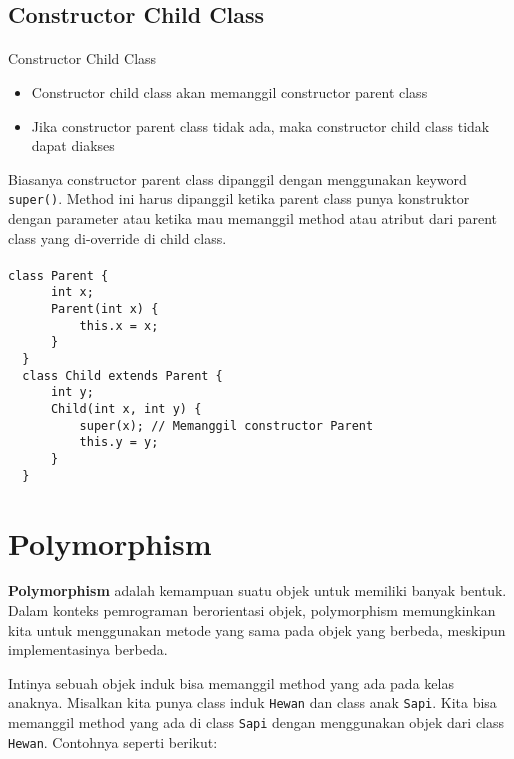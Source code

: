 \documentclass{../praktikum-ppt}
\begin{document}
    \subsection{Constructor Child Class}
    \begin{frame}{\insertsection}
      \framesubtitle{\insertsubsection}
        \begin{block}{Constructor Child Class}
            \begin{itemize}
                \item Constructor child class akan memanggil constructor parent class
                \item Jika constructor parent class tidak ada, maka constructor child class tidak dapat diakses
            \end{itemize}
        \end{block}
        Biasanya constructor parent class dipanggil dengan menggunakan keyword \texttt{super()}. Method ini harus dipanggil ketika parent class punya konstruktor dengan parameter atau ketika mau memanggil method atau atribut dari parent class yang di-override di child class.
  \end{frame}
    \begin{frame}[fragile]{\insertsection}
      \framesubtitle{\insertsubsection}
        \begin{lstlisting}[caption={Contoh constructor child class}]
  class Parent {
      int x;
      Parent(int x) {
          this.x = x;
      }
  }
  class Child extends Parent {
      int y;
      Child(int x, int y) {
          super(x); // Memanggil constructor Parent
          this.y = y;
      }
  }
        \end{lstlisting}
    \end{frame}

    \section{Polymorphism}
    \begin{frame}{\insertsection}
        \begin{definisi}
            \textbf{Polymorphism} adalah kemampuan suatu objek untuk memiliki banyak bentuk. Dalam konteks pemrograman berorientasi objek, polymorphism memungkinkan kita untuk menggunakan metode yang sama pada objek yang berbeda, meskipun implementasinya berbeda.
        \end{definisi}
        Intinya sebuah objek induk bisa memanggil method yang ada pada kelas anaknya. Misalkan kita punya class induk \texttt{Hewan} dan class anak \texttt{Sapi}. Kita bisa memanggil method yang ada di class \texttt{Sapi} dengan menggunakan objek dari class \texttt{Hewan}. Contohnya seperti berikut:
    \end{frame}
\end{document}
